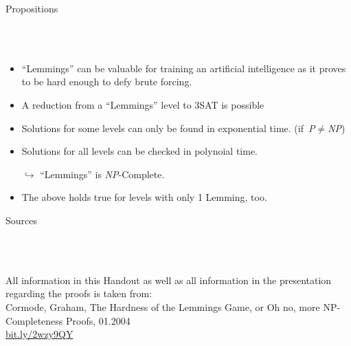 \documentclass[a5paper, 8pt]{scrartcl} %
\begin{document}
\vspace*{0.5cm}
\begin{Large}
Propositions
\end{Large}\\\vspace*{-0.25cm}
\hrulefill\\\vspace*{0.3cm}
\begin{minipage}{0.93\textwidth}
\begin{itemize}
\item ``Lemmings'' can be valuable for training an artificial intelligence as it proves to be hard enough to defy brute forcing.
\item A reduction from a ``Lemmings'' level to 3SAT is possible
\item Solutions for some levels can only be found in exponential time. (if~\emph{P}$\neq$\emph{NP})
\item Solutions for all levels can be checked in polynoial time.
\item[$\hookrightarrow$] ``Lemmings'' is \emph{NP}-Complete.
\item The above holds true for levels with only 1 Lemming, too.
\end{itemize}
\end{minipage}

\vspace*{0.5cm}
\begin{Large}
Sources
\end{Large}\\\vspace*{-0.25cm}
\hrulefill\\\vspace*{0.3cm}
\begin{minipage}{0.93\textwidth}
All information in this Handout as well as all information in the presentation regarding the proofs is taken from:\\
Cormode, Graham, The Hardness of the Lemmings Game, or
Oh no, more NP-Completeness Proofs, 01.2004\\
\url{bit.ly/2wzy9QY}
\end{minipage}
\end{document}
